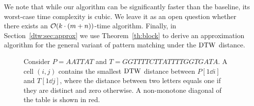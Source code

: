 We note that while our algorithm can be significantly faster than the baseline, its worst-case time complexity is cubic. We leave it as an open question whether there exists an $\mathcal{O}(k \cdot (m+n))$-time algorithm.  Finally, in Section~\ref{dtw:sec:approx} we use Theorem~\ref{th:block} to derive an approximation algorithm for the general variant of pattern matching under the $\mathrm{DTW}$ distance. 

\begin{figure}[H]
\caption{Consider $P = AATTAT$ and $T=GGTTTTCTTATTTTGGTGATA$. A cell $(i,j)$ contains the smallest $\mathrm{DTW}$ distance between $P[1\dd i]$ and $T[1\dd j]$, where the distance between two letters equals one if they are distinct and zero otherwise. A non-monotone diagonal of the table is shown in red.}  
\label{fig:decreasing}
\end{figure}
